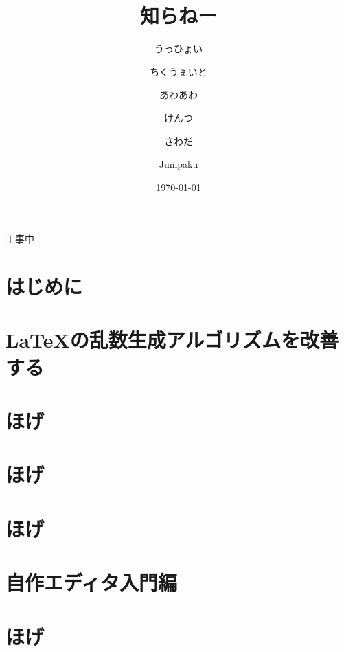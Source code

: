 \documentclass[autodetect-engine,dvipdfmx-if-dvi,ja=standard,a4paper,12pt,twoside,openany,layout=v2]{bxjsbook}
\title{知らねー}
\author{うっひょい \and ちくうぇいと \and あわあわ \and けんつ \and さわだ \and Jumpaku}
\date{\today}
\begin{document}
\begin{titlepage}
  \begin{center}
    \Huge 工事中
  \end{center}
\end{titlepage}
\maketitle
\frontmatter
\chapter{はじめに}


\tableofcontents
\mainmatter
{}
\chapter{\LaTeX の乱数生成アルゴリズムを改善する}


\chapter{ほげ}


\chapter{ほげ}


\chapter{ほげ}


\chapter{自作エディタ入門編}


\chapter{ほげ}


\newpage
\myimpression
\end{document}
